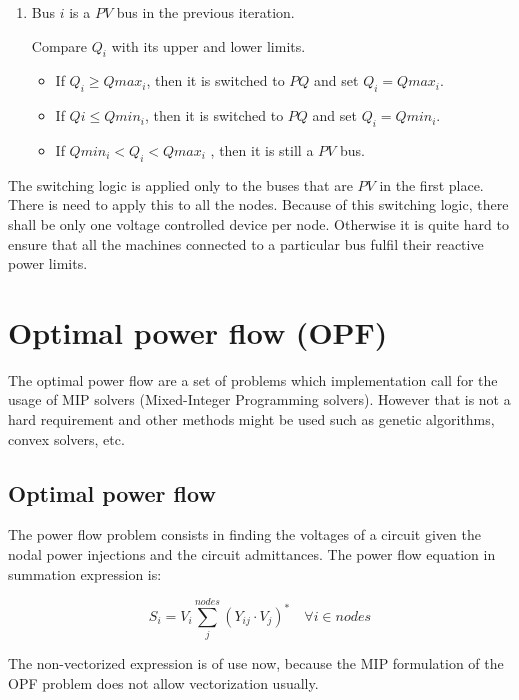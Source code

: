 \documentclass[nols,a4paper,twoside,notoc,fleqn]{tufte-book}
\begin{document}
\begin{enumerate}
	\item Bus $i$ is a $PV$ bus in the previous iteration.
	
	Compare $Q_i$ with its upper and lower limits.
	
	\begin{itemize}
		\item If $Q_i \geq Qmax_i$, then it is switched to $PQ$ and set $Q_i = Qmax_i$.
		\item If $Qi \leq Qmin_i$, then it is switched to $PQ$ and set $Q_i = Qmin_i$.
		\item If $Qmin_i < Q_i < Qmax_i$ , then it is still a $PV$ bus.
	\end{itemize}
\end{enumerate}

The switching logic is applied only to the buses that are $PV$ in the first place. There is need to apply this to all the nodes. Because of this switching logic, there shall be only one voltage controlled device per node. Otherwise it is quite hard to ensure that all the machines connected to a particular bus fulfil their reactive power limits.


\chapter{Optimal power flow (OPF)}

The optimal power flow are a set of problems which implementation call for the usage of MIP solvers (Mixed-Integer Programming solvers). However that is not a hard requirement and other methods might be used such as genetic algorithms, convex solvers, etc.


\section{Optimal power flow}

The power flow problem consists in finding the voltages of a circuit given the nodal power injections and the circuit admittances. The power flow equation in summation expression is:

\begin{equation}
S_i=V_i \sum_j^{nodes} \left(Y_{ij} \cdot V_j\right) ^* \quad  \forall i \in nodes
\end{equation}

The non-vectorized expression is of use now, because the MIP formulation of the OPF problem does not allow vectorization usually.
\end{document}
